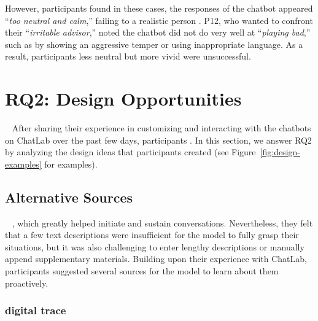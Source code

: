 However, participants found in these cases, the responses of the chatbot  appeared ``\textit{too neutral and calm},'' failing to  a realistic person . P12, who wanted to confront their ``\textit{irritable advisor},'' noted the chatbot did not do very well at ``\textit{playing bad},'' such as by showing an aggressive temper or using inappropriate language. As a result, participants  less neutral but more vivid  were unsuccessful.

\section{RQ2: Design Opportunities }~\label{RQ2}
After sharing their experience in customizing and interacting with the chatbots on ChatLab over the past few days, participants . In this section, we answer RQ2 by analyzing the design ideas that participants created (see Figure~\ref{fig:design-examples} for examples).



\subsection{ Alternative Sources }~\label{learnoneself}
, which greatly helped initiate and sustain conversations. Nevertheless, they felt that a few text descriptions were insufficient for the model to fully grasp their situations, but it was also challenging to enter lengthy descriptions or manually append supplementary materials. Building upon their experience with ChatLab, participants suggested several sources for the model to learn about them proactively.



\subsubsection{ digital trace }~\label{digital trace}

